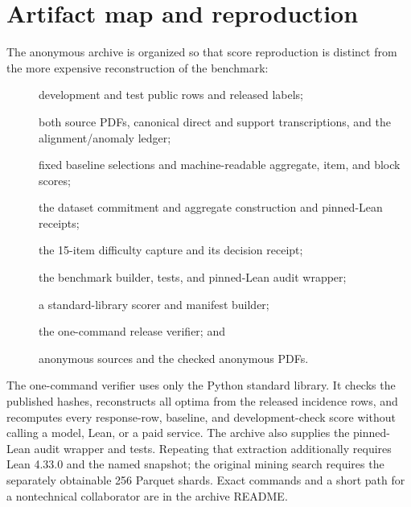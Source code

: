 \section{Artifact map and reproduction}

The anonymous archive is organized so that score reproduction is distinct from
the more expensive reconstruction of the benchmark:

\begin{description}
  \item[] development and test public rows and released labels;
  \item[] both source PDFs, canonical direct and support
        transcriptions, and the alignment/anomaly ledger;
  \item[] fixed baseline selections and machine-readable
        aggregate, item, and block scores;
  \item[] the dataset commitment and aggregate construction
        and pinned-Lean receipts;
  \item[] the 15-item difficulty capture and its
        decision receipt;
  \item[] the benchmark builder, tests, and pinned-Lean
        audit wrapper;
  \item[] a standard-library scorer and manifest builder;
  \item[] the one-command release verifier; and
  \item[] anonymous sources and the checked anonymous PDFs.
\end{description}

The one-command verifier uses only the Python standard library.  It checks the
published hashes, reconstructs all optima from the released incidence rows, and
recomputes every response-row, baseline, and development-check score without calling a
model, Lean, or a paid service.  The archive also supplies the pinned-Lean audit
wrapper and tests.  Repeating that extraction additionally requires Lean 4.33.0
and the named \mathlib{} snapshot; the original mining search requires the
separately obtainable 256 Parquet shards.  Exact commands and a short path for
a nontechnical collaborator are in the archive README.

\ifdefined\StandaloneTechnicalSupplement
  
  
\fi
